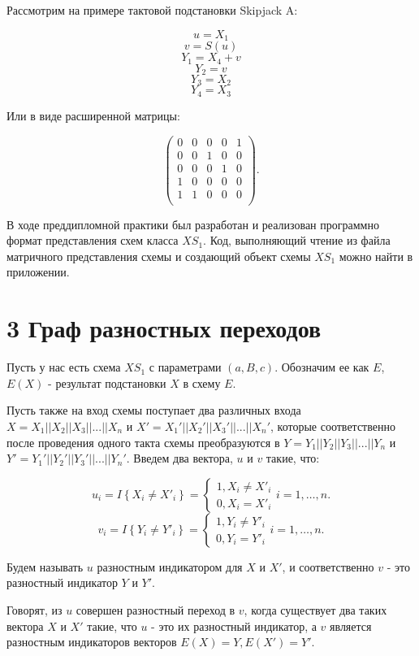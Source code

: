 \documentclass[a4paper,14pt]{extarticle}
\begin{document}
Рассмотрим на примере тактовой подстановки Skipjack A:

$$u = X_1$$
$$v = S(u)$$
$$Y_1 = X_4 + v$$
$$Y_2 = v$$
$$Y_3 = X_2$$
$$Y_4 = X_3$$

Или в виде расширенной матрицы:

$$
\begin{pmatrix}
0 & 0 & 0 & 0 & 1\\
0 & 0 & 1 & 0 & 0\\
0 & 0 & 0 & 1 & 0\\
1 & 0 & 0 & 0 & 0\\
1    & 1    & 0 & 0    & 0\\
\end{pmatrix}.
$$

В ходе преддипломной практики был разработан и реализован программно формат представления схем класса $XS_1$. Код, выполняющий чтение из файла матричного представления схемы и создающий объект схемы $XS_1$ можно найти в приложении. 

\newpage
\section*{3 Граф разностных переходов}
\vspace*{1cm}

Пусть у нас есть схема $XS_1$ с параметрами $(a, B, c)$. Обозначим ее как $E$,  $E(X)$ - результат подстановки $X$ в схему $E$. 

Пусть также на вход схемы поступает два различных входа $X=X_1||X_2||X_3||...||X_n$ и $X'=X_1'||X_2'||X_3'||...||X_n'$, которые соответственно после проведения одного такта схемы преобразуются в $Y=Y_1||Y_2||Y_3||...||Y_n$ и $Y'=Y_1'||Y_2'||Y_3'||...||Y_n'$. Введем два вектора, $u$ и $v$ такие, что:

$$
u_i=I\left\{X_i\ne X'_i\right\}=\left\{ \begin{array}{c}
1,X_i\ne X'_i \\
0,X_i=X'_i \end{array}
\right.i=1,\dots , n.
$$
$$
v_i=I\left\{Y_i\ne Y'_i\right\}=\left\{ \begin{array}{c}
1,Y_i\ne Y'_i \\
0,Y_i=Y'_i \end{array}
\right.i=1,\dots , n.
$$

Будем называть $u$ разностным индикатором для $X$ и $X'$, и соответственно $v$ - это разностный индикатор $Y$ и $Y'$.

Говорят, из $u$ совершен разностный переход в $v$, когда существует два таких вектора $X$ и $X'$ такие, что $u$ - это их разностный индикатор, а $v$ является разностным индикаторов векторов $E(X) = Y, E(X') = Y'$.
\end{document}
